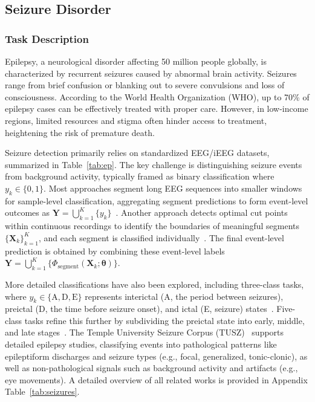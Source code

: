 \subsection{Seizure Disorder}


\subsubsection{Task Description}
Epilepsy, a neurological disorder affecting 50 million people globally, is characterized by recurrent seizures caused by abnormal brain activity. 
Seizures range from brief confusion or blanking out to severe convulsions and loss of consciousness. According to the World Health Organization (WHO), up to 70\% of epilepsy cases can be effectively treated with proper care. However, in low-income regions, limited resources and stigma often hinder access to treatment, heightening the risk of premature death\cite{WHO_epilepsy}.

Seizure detection primarily relies on standardized EEG/iEEG datasets, summarized in Table~\ref{tab:ep}. The key challenge is distinguishing seizure events from background activity, typically framed as binary classification where $y_k \in \{0, 1\}$. 
Most approaches segment long EEG sequences into smaller windows for sample-level classification, aggregating segment predictions to form event-level outcomes as $\mathbf{Y} = \bigcup_{k=1}^K \{y_k\}$~\cite{xu2023patient,peng2023wavelet2vec}. 
Another approach detects optimal cut points within continuous recordings to identify the boundaries of meaningful segments $\{\mathbf{X}_k\}_{k=1}^K$, and each segment is classified individually~\cite{Zhan2020EpilepsyDetection}. 
The final event-level prediction is obtained by combining these event-level labels $\mathbf{Y} = \bigcup_{k=1}^K \{\Phi_{\text{segment}}(\mathbf{X}_k; \boldsymbol{\theta})\}$.

More detailed classifications have also been explored, including three-class tasks, where $y_k \in \{\text{A}, \text{D}, \text{E}\}$ represents interictal (A, the period between seizures), preictal (D, the time before seizure onset), and ictal (E, seizure) states~\cite{zhou2018epileptic}. Five-class tasks refine this further by subdividing the preictal state into early, middle, and late stages~\cite{turk2019epilepsy}. The Temple University Seizure Corpus (TUSZ)~\cite{shah2018temple} supports detailed epilepsy studies, classifying events into pathological patterns like epileptiform discharges and seizure types (e.g., focal, generalized, tonic-clonic), as well as non-pathological signals such as background activity and artifacts (e.g., eye movements).
A detailed overview of all related works is provided in Appendix Table~\ref{tab:seizures}.


